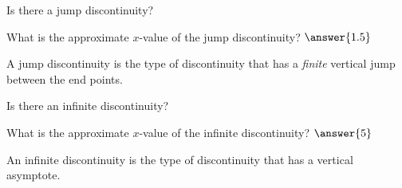 \documentclass{ximera}
\begin{document}
\begin{problem}
\begin{problem}
        \begin{problem}
            Is there a jump discontinuity?
            \begin{multipleChoice}
            \end{multipleChoice}
            
            \begin{problem}
                What is the approximate $x$-value of the jump discontinuity? $\answer{1.5}$
                \begin{feedback}
                    A jump discontinuity is the type of discontinuity that has a \textit{finite} vertical jump between the end points.
                \end{feedback}
                \begin{problem}
                    Is there an infinite discontinuity?
                    \begin{multipleChoice}
                    \end{multipleChoice}
                    
                    \begin{problem}
                        What is the approximate $x$-value of the infinite discontinuity? $\answer{5}$
                        \begin{feedback}
                            An infinite discontinuity is the type of discontinuity that has a vertical asymptote.
                        \end{feedback}
                    \end{problem}
                \end{problem}
            \end{problem}
        \end{problem}
    \end{problem}
\end{problem}
\end{document}
